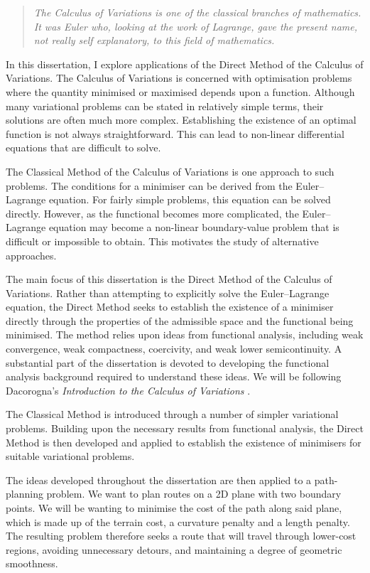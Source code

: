 \begin{quote}
\textit{The Calculus of Variations is one of the classical branches of
mathematics. It was Euler who, looking at the work of Lagrange, gave the
present name, not really self explanatory, to this field of mathematics.}\cite[p.~1]{dacorogna}
\end{quote}

In this dissertation, I explore applications of the Direct Method of the Calculus of Variations. The Calculus of Variations is concerned with optimisation problems where the quantity minimised or maximised depends upon a function. Although many variational problems can be stated in relatively simple terms, their solutions are often much more complex. Establishing the existence of an optimal function is not always straightforward. This can lead to non-linear differential equations that are difficult to solve. 

The Classical Method of the Calculus of Variations is one approach to such problems. The conditions for a minimiser can be derived from the Euler--Lagrange equation. For fairly simple problems, this equation can be solved directly. However, as the functional becomes more complicated, the Euler--Lagrange equation may become a non-linear boundary-value problem that is difficult or impossible to obtain. This motivates the study of alternative approaches.

The main focus of this dissertation is the Direct Method of the Calculus of Variations. Rather than attempting to explicitly solve the Euler--Lagrange equation, the Direct Method seeks to establish the existence of a minimiser directly through the properties of the admissible space and the functional being minimised. The method relies upon ideas from functional analysis, including weak convergence, weak compactness, coercivity, and weak lower semicontinuity. A substantial part of the dissertation is devoted to developing the functional analysis background required to understand these ideas. We will be following Dacorogna's \textit{Introduction to the Calculus of Variations} \cite{dacorogna}.

The Classical Method is introduced through a number of simpler variational problems. Building upon the necessary results from functional analysis, the Direct Method is then developed and applied to establish the existence of minimisers for suitable variational problems.

The ideas developed throughout the dissertation are then applied to a path-planning problem. We want to plan routes on a 2D plane with two boundary points. We will be wanting to minimise the cost of the path along said plane, which is made up of the terrain cost, a curvature penalty and a length penalty. The resulting problem therefore seeks a route that  will travel through lower-cost regions, avoiding unnecessary detours, and maintaining a degree of geometric smoothness.


